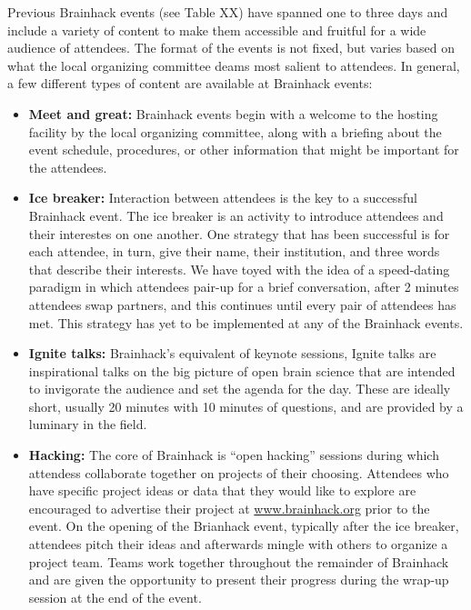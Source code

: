 \documentclass[11pt]{bmc_article_s50}
\providecommand{\tightlist}{%
  \setlength{\itemsep}{0pt}\setlength{\parskip}{0pt}}
\begin{document}
Previous Brainhack events (see Table XX) have spanned one to three days
and include a variety of content to make them accessible and fruitful
for a wide audience of attendees. The format of the events is not fixed,
but varies based on what the local organizing committee deams most
salient to attendees. In general, a few different types of content are
available at Brainhack events:

\begin{itemize}
\tightlist
\item
  \textbf{Meet and great:} Brainhack events begin with a welcome to the
  hosting facility by the local organizing committee, along with a
  briefing about the event schedule, procedures, or other information
  that might be important for the attendees.
\item
  \textbf{Ice breaker:} Interaction between attendees is the key to a
  successful Brainhack event. The ice breaker is an activity to
  introduce attendees and their interestes on one another. One strategy
  that has been successful is for each attendee, in turn, give their
  name, their institution, and three words that describe their
  interests. We have toyed with the idea of a speed-dating paradigm in
  which attendees pair-up for a brief conversation, after 2 minutes
  attendees swap partners, and this continues until every pair of
  attendees has met. This strategy has yet to be implemented at any of
  the Brainhack events.
\item
  \textbf{Ignite talks:} Brainhack's equivalent of keynote sessions,
  Ignite talks are inspirational talks on the big picture of open brain
  science that are intended to invigorate the audience and set the
  agenda for the day. These are ideally short, usually 20 minutes with
  10 minutes of questions, and are provided by a luminary in the field.
\item
  \textbf{Hacking:} The core of Brainhack is ``open hacking'' sessions
  during which attendess collaborate together on projects of their
  choosing. Attendees who have specific project ideas or data that they
  would like to explore are encouraged to advertise their project at
  \href{http://www.brainhack.org}{www.brainhack.org} prior to the event.
  On the opening of the Brianhack event, typically after the ice
  breaker, attendees pitch their ideas and afterwards mingle with others
  to organize a project team. Teams work together throughout the
  remainder of Brainhack and are given the opportunity to present their
  progress during the wrap-up session at the end of the event.

\end{itemize}
\end{document}
